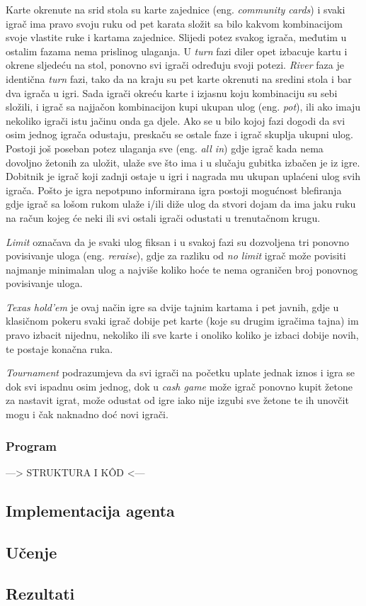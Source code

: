 Karte okrenute na srid stola su karte zajednice (eng. \textit{community cards}) i svaki igrač ima pravo svoju ruku od pet karata složit sa bilo kakvom kombinacijom svoje vlastite ruke i kartama zajednice. Slijedi potez svakog igrača, međutim u ostalim fazama nema prislinog ulaganja. U \emph{turn} fazi diler opet izbacuje kartu i okrene sljedeću na stol, ponovno svi igrači određuju svoji potezi. \emph{River} faza je identična \emph{turn} fazi, tako da na kraju su pet karte okrenuti na sredini stola i bar dva igrača u igri. Sada igrači okreću karte i izjasnu koju kombinaciju su sebi složili, i igrač sa najjačon kombinacijon kupi ukupan ulog (eng. \textit{pot}), ili ako imaju nekoliko igrači istu jačinu onda ga djele. Ako se u bilo kojoj fazi dogodi da svi osim jednog igrača odustaju, preskaču se ostale faze i igrač skuplja ukupni ulog. Postoji još poseban potez ulaganja sve (eng. \textit{all in}) gdje igrač kada nema dovoljno žetonih za uložit, ulaže sve što ima i u slučaju gubitka izbačen je iz igre. Dobitnik je igrač koji zadnji ostaje u igri i nagrada mu ukupan uplaćeni ulog svih igrača. Pošto je igra nepotpuno informirana igra postoji mogućnost blefiranja gdje igrač sa lošom rukom ulaže i/ili diže ulog da stvori dojam da ima jaku ruku na račun kojeg će neki ili svi ostali igrači odustati u trenutačnom krugu.


\emph{Limit} označava da je svaki ulog fiksan i u svakoj fazi su dozvoljena tri ponovno povisivanje uloga (eng. \textit{reraise}), gdje za razliku od \emph{no limit} igrač može povisiti najmanje minimalan ulog a najviše koliko hoće te nema ograničen broj ponovnog povisivanje uloga.

\emph{Texas hold'em} je ovaj način igre sa dvije tajnim kartama i pet javnih, gdje u klasičnom pokeru svaki igrač dobije pet karte (koje su drugim igračima tajna) im pravo izbacit nijednu, nekoliko ili sve karte i onoliko koliko je izbaci dobije novih, te postaje konačna ruka.

\emph{Tournament} podrazumjeva da svi igrači na početku uplate jednak iznos i igra se dok svi ispadnu osim jednog, dok u \emph{cash game} može igrač ponovno kupit žetone za nastavit igrat, može odustat od igre 
iako nije izgubi sve žetone te ih unovčit mogu i čak naknadno doć novi igrači.

\subsubsection{Program}
---> STRUKTURA I K\^OD <---


\subsection{Implementacija agenta}
\subsection{Učenje}
\subsection{Rezultati}